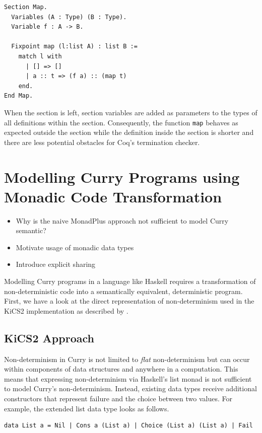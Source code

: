 \documentclass[a4paper, 11pt, fleqn, twoside]{scrreprt}
\newcommand{\todo}[1]{\marginpar{\textbf{TODO:} #1}}
\newcommand{\cinl}[1]{\texttt{#1}}
\begin{document}
\begin{verbatim}
Section Map.
  Variables (A : Type) (B : Type).
  Variable f : A -> B.

  Fixpoint map (l:list A) : list B :=
    match l with
      | [] => []
      | a :: t => (f a) :: (map t)
    end.
End Map.
\end{verbatim}

When the section is left, section variables are added as parameters to the types of all definitions within the section.
Consequently, the function \cinl{map} behaves as expected outside the section while the definition inside the section is shorter and there are less potential obstacles for Coq's termination checker.

\section{Modelling Curry Programs using Monadic Code Transformation}
\begin{itemize}
\item Why is the naive MonadPlus approach not sufficient to model Curry semantic?
\item Motivate usage of monadic data types
\item Introduce explicit sharing
\end{itemize}

Modelling Curry programs in a language like Haskell requires a transformation of non-deterministic code into a semantically equivalent, deterministic program.
First, we have a look at the direct representation of non-determinism used in the KiCS2 implementation as described by \citet{brassel2011kics2}.

\subsection{KiCS2 Approach}
Non-determinism in Curry is not limited to \textit{flat} non-determinism but can occur within components of data structures and anywhere in a computation.
This means that expressing non-determinism via Haskell's list monad is not sufficient to model Curry's non-determinism.
\todo{Example}
Instead, existing data types receive additional constructors that represent failure and the choice between two values.
For example, the extended list data type looks as follows.

\begin{verbatim}
data List a = Nil | Cons a (List a) | Choice (List a) (List a) | Fail
\end{verbatim}
\end{document}
